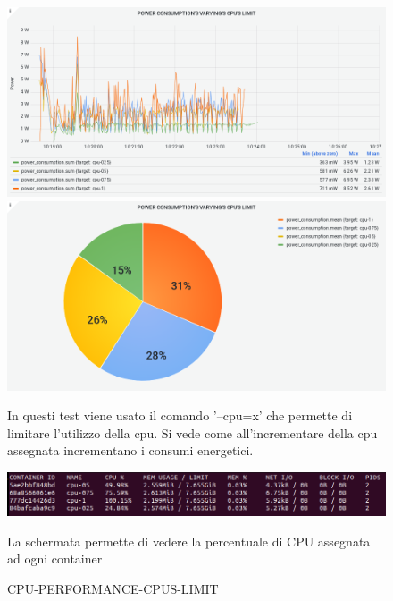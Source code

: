 \documentclass[a4paper, 11pt]{article}
\begin{document}
\begin{figure}[h]
\caption{CPU-PERFORMANCE-CPUS-LIMIT}
\centering
\includegraphics[scale=0.4]{image30}
\includegraphics[scale=0.4]{image35}
\begin{flushleft}
In questi test viene usato il comando '--cpu=x' che permette di limitare l'utilizzo della cpu.
Si vede come all'incrementare della cpu assegnata incrementano i consumi energetici.
\end{flushleft}
\includegraphics[scale=0.4]{cpus}
\begin{flushleft}
{La schermata permette di vedere la percentuale di CPU assegnata ad ogni container}
\end{flushleft}
\end{figure}
\end{document}
